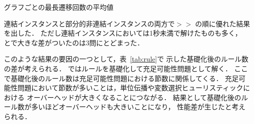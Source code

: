 \begin{table}[htbp]
  \centering
  \caption{グラフごとの最長遷移回数の平均値}
  
  \label{tab:ave_unknown}
\end{table}

連結インスタンスと部分的非連結インスタンスの両方で$>$$>$
の順に優れた結果を出した．
ただし連結インスタンスにおいては1秒未満で解けたものも多く，
とで大きな差がついたのは3問にとどまった．

このような結果の要因の一つとして，表~\ref{tab:rule}で
示した基礎化後のルール数の差が考えられる．
{\clingo}ではルールを基礎化して充足可能性問題として解く．
ここで基礎化後のルール数は充足可能性問題における節数に関係してくる．
充足可能性問題において節数が多いことは，単位伝播や変数選択ヒューリスティックにおける
オーバーヘッドが大きくなることにつながる．
結果として基礎化後のルール数が多いほどオーバーヘッドも大きいことになり，
性能差が生じたと考えられる．

%

